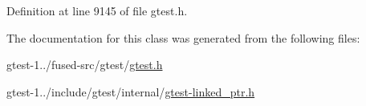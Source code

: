 \-Definition at line 9145 of file gtest.\-h.



\-The documentation for this class was generated from the following files\-:\begin{DoxyCompactItemize}
\item 
gtest-\/1../fused-\/src/gtest/\hyperlink{fused-src_2gtest_2gtest_8h}{gtest.\-h}\item 
gtest-\/1../include/gtest/internal/\hyperlink{gtest-linked__ptr_8h}{gtest-\/linked\-\_\-ptr.\-h}\end{DoxyCompactItemize}
